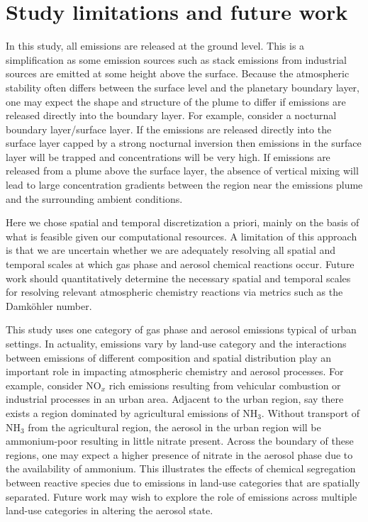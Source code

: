 
\section{Study limitations and future work}

In this study, all emissions are released at the ground level. This is a simplification as some emission sources such as stack emissions from industrial sources are emitted at some height above the surface. Because the atmospheric stability often differs between the surface level and the planetary boundary layer, one may expect the shape and structure of the plume to differ if emissions are released directly into the boundary layer. For example, consider a nocturnal boundary layer/surface layer. If the emissions are released directly into the surface layer capped by a strong nocturnal inversion then emissions in the surface layer will be trapped and concentrations will be very high. If emissions are released from a plume above the surface layer, the absence of vertical mixing will lead to large concentration gradients between the region near the emissions plume and the surrounding ambient conditions. 

Here we chose spatial and temporal discretization a priori, mainly on the basis of what is feasible given our computational resources. A limitation of this approach is that we are uncertain whether we are adequately resolving all spatial and temporal scales at which gas phase and aerosol chemical reactions occur. Future work should quantitatively determine the necessary spatial and temporal scales for resolving relevant atmospheric chemistry reactions via metrics such as the Damköhler number.

This study uses one category of gas phase and aerosol emissions typical of urban settings. In actuality, emissions vary by land-use category and the interactions between emissions of different composition and spatial distribution play an important role in impacting atmospheric chemistry and aerosol processes. For example, consider NO$_x$ rich emissions resulting from vehicular combustion or industrial processes in an urban area. Adjacent to the urban region, say there exists a region dominated by agricultural emissions of NH$_3$. Without transport of NH$_3$ from the agricultural region, the aerosol in the urban region will be ammonium-poor resulting in little nitrate present. Across the boundary of these regions, one may expect a higher presence of nitrate in the aerosol phase due to the availability of ammonium. This illustrates the effects of chemical segregation between reactive species due to emissions in land-use categories that are spatially separated. Future work may wish to explore the role of emissions across multiple land-use categories in altering the aerosol state. 

